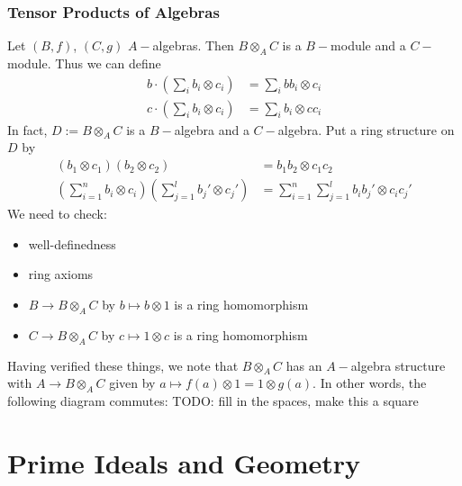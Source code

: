 \documentclass[11pt, a4paper]{memoir}
\theoremstyle{change}
\theoremstyle{plain}
\theoremstyle{nonumberplain}
\numberwithin{equation}{section}
\begin{document}
\subsection{Tensor Products of Algebras}
Let $(B,f)$, $(C,g)$ $A-$algebras.
Then $B\otimes_A C$ is a $B-$module and a $C-$module.
Thus we can define
\begin{align*}
    b\cdot\left(\sum_i b_i\otimes c_i\right)&=\sum_i bb_i\otimes c_i\\
    c\cdot\left(\sum_i b_i\otimes c_i\right)&=\sum_i b_i\otimes cc_i
\end{align*}
In fact, $D:= B\otimes_A C$ is a $B-$algebra and a $C-$algebra.
Put a ring structure on $D$ by
\begin{align*}
    (b_1\otimes c_1)(b_2\otimes c_2)&=b_1b_2\otimes c_1c_2\\
    \left(\sum_{i=1}^nb_i\otimes c_i\right)\left(\sum_{j=1}^l b_j'\otimes c_j'\right)&=\sum_{i=1}^n\sum_{j=1}^l b_ib_j'\otimes c_ic_j'
\end{align*}
We need to check:
\begin{itemize}[nolistsep]
    \item well-definedness
    \item ring axioms
    \item $B\to B\otimes_A C$ by $b\mapsto b\otimes 1$ is a ring homomorphism
    \item $C\to B\otimes_A C$ by $c\mapsto 1\otimes c$ is a ring homomorphism
\end{itemize}
Having verified these things, we note that $B\otimes_A C$ has an $A-$algebra structure with $A\to B\otimes_A C$ given by $a\mapsto f(a)\otimes 1=1\otimes g(a)$.
In other words, the following diagram commutes: TODO: fill in the spaces, make this a square
\begin{center}
\end{center}
\chapter{Prime Ideals and Geometry}
\end{document}
